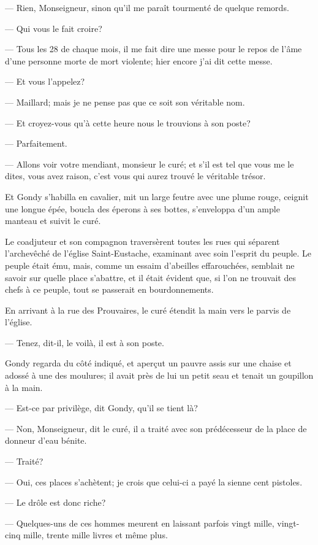 — Rien, Monseigneur, sinon qu'il me paraît tourmenté de quelque remords.

— Qui vous le fait croire?

— Tous les 28 de chaque mois, il me fait dire une messe pour le repos de l'âme d'une personne morte de mort violente; hier encore j'ai dit cette messe.

— Et vous l'appelez?

— Maillard; mais je ne pense pas que ce soit son véritable nom.

— Et croyez-vous qu'à cette heure nous le trouvions à son poste?

— Parfaitement.

— Allons voir votre mendiant, monsieur le curé; et s'il est tel que vous me le dites, vous avez raison, c'est vous qui aurez trouvé le véritable trésor.

Et Gondy s'habilla en cavalier, mit un large feutre avec une plume rouge, ceignit une longue épée, boucla des éperons à ses bottes, s'enveloppa d'un ample manteau et suivit le curé.

Le coadjuteur et son compagnon traversèrent toutes les rues qui séparent l'archevêché de l'église Saint-Eustache, examinant avec soin l'esprit du peuple. Le peuple était ému, mais, comme un essaim d'abeilles effarouchées, semblait ne savoir sur quelle place s'abattre, et il était évident que, si l'on ne trouvait des chefs à ce peuple, tout se passerait en bourdonnements.

En arrivant à la rue des Prouvaires, le curé étendit la main vers le parvis de l'église.

— Tenez, dit-il, le voilà, il est à son poste.

Gondy regarda du côté indiqué, et aperçut un pauvre assis sur une chaise et adossé à une des moulures; il avait près de lui un petit seau et tenait un goupillon à la main.

— Est-ce par privilège, dit Gondy, qu'il se tient là?

— Non, Monseigneur, dit le curé, il a traité avec son prédécesseur de la place de donneur d'eau bénite.

— Traité?

— Oui, ces places s'achètent; je crois que celui-ci a payé la sienne cent pistoles.

— Le drôle est donc riche?

— Quelques-uns de ces hommes meurent en laissant parfois vingt mille, vingt-cinq mille, trente mille livres et même plus.

